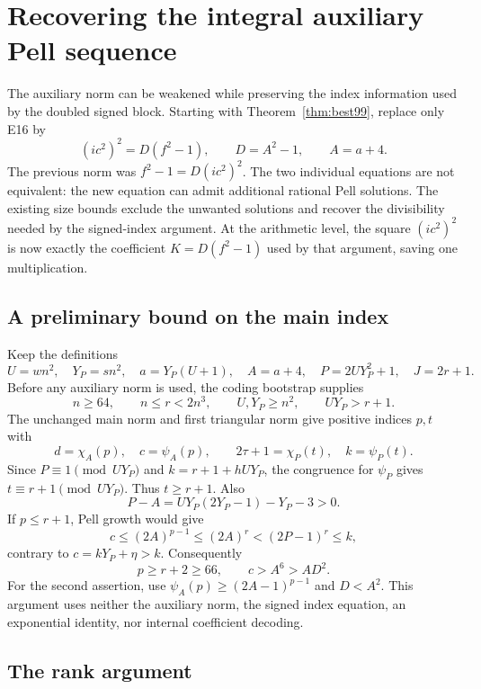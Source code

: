 \section{Recovering the integral auxiliary Pell sequence}
\label{sec:relaxed-auxiliary}

The auxiliary norm can be weakened while preserving the index information
used by the doubled signed block. Starting with Theorem~\ref{thm:best99},
replace only E16 by
\begin{equation}\label{eq:relaxed-auxiliary-norm}
 (ic^2)^2=D(f^2-1),\qquad D=A^2-1,\qquad A=a+4.
\end{equation}
The previous norm was $f^2-1=D(ic^2)^2$. The two individual equations
are not equivalent: the new equation can admit additional rational
Pell solutions. The existing size bounds exclude the unwanted
solutions and recover the divisibility needed by the signed-index
argument. At the arithmetic level, the square $(ic^2)^2$ is now
exactly the coefficient $K=D(f^2-1)$ used by that argument, saving
one multiplication.

\subsection{A preliminary bound on the main index}

Keep the definitions
\[
 U=wn^2,\quad Y_P=sn^2,\quad a=Y_P(U+1),\quad
 A=a+4,\quad P=2UY_P^2+1,\quad J=2r+1.
\]
Before any auxiliary norm is used, the coding bootstrap supplies
\[
 n\ge64,\qquad n\le r<2n^3,\qquad U,Y_P\ge n^2,
 \qquad UY_P>r+1.
\]
The unchanged main norm and first triangular norm give positive
indices $p,t$ with
\[
 d=\chi_A(p),\quad c=\psi_A(p),\qquad
 2\tau+1=\chi_P(t),\quad k=\psi_P(t).
\]
Since $P\equiv1\pmod{UY_P}$ and $k=r+1+hUY_P$, the congruence
for $\psi_P$ gives $t\equiv r+1\pmod{UY_P}$. Thus $t\ge r+1$.
Also
\[
 P-A=UY_P(2Y_P-1)-Y_P-3>0.
\]
If $p\le r+1$, Pell growth would give
\[
 c\le(2A)^{p-1}\le(2A)^r
  <(2P-1)^r\le k,
\]
contrary to $c=kY_P+\eta>k$. Consequently
\begin{equation}\label{eq:relaxed-main-index-bound}
 p\ge r+2\ge66,\qquad c>A^6>A D^2.
\end{equation}
For the second assertion, use
$\psi_A(p)\ge(2A-1)^{p-1}$ and $D<A^2$.
This argument uses neither the auxiliary norm, the signed index
equation, an exponential identity, nor internal coefficient decoding.

\subsection{The rank argument}

